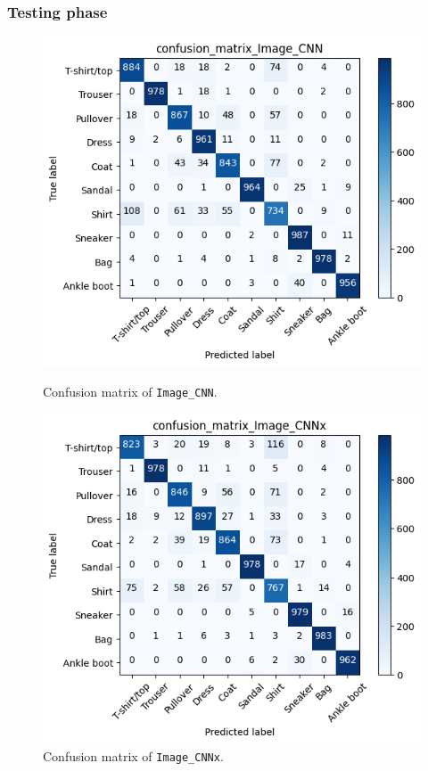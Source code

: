 \subsubsection{Testing phase}
\begin{figure}[!h]
    \centering
    \begin{minipage}{0.48\textwidth}
        \centering
        \captionsetup{justification=centering}
        \includegraphics[width=\linewidth]{obrazky-figures/Image_experiment/confusion_matrix_Image_CNN_2023-03-27_21:34:30.png}
        \caption{Confusion matrix of \texttt{Image\_CNN}.}
        \label{graph-image-cm-cnn}
    \end{minipage}\hfill
    \begin{minipage}{0.48\textwidth}
        \centering
        \captionsetup{justification=centering}
        \includegraphics[width=\linewidth]{obrazky-figures/Image_experiment/confusion_matrix_Image_CNNx_2023-03-27_21:34:33.png}
        \caption{Confusion matrix of \texttt{Image\_CNNx}.}
        \label{graph-image-cm-cnnx}
    \end{minipage}
\end{figure}
